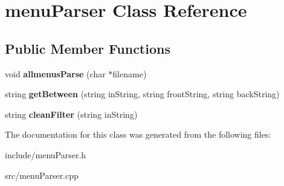 \hypertarget{classmenu_parser}{\section{menu\-Parser Class Reference}
\label{classmenu_parser}
}
\subsection*{Public Member Functions}
\begin{DoxyCompactItemize}
\item 
\hypertarget{classmenu_parser_a45594a2c3a48ac0acb2edad3d0259aef}{void {\bfseries allmenus\-Parse} (char $\ast$filename)}\label{classmenu_parser_a45594a2c3a48ac0acb2edad3d0259aef}

\item 
\hypertarget{classmenu_parser_a8061fb1d8a409aff7f2a2f59eccc7381}{string {\bfseries get\-Between} (string in\-String, string front\-String, string back\-String)}\label{classmenu_parser_a8061fb1d8a409aff7f2a2f59eccc7381}

\item 
\hypertarget{classmenu_parser_aca1249a8d37564e493c4ab6f8cd14344}{string {\bfseries clean\-Filter} (string in\-String)}\label{classmenu_parser_aca1249a8d37564e493c4ab6f8cd14344}

\end{DoxyCompactItemize}


The documentation for this class was generated from the following files\-:\begin{DoxyCompactItemize}
\item 
include/menu\-Parser.\-h\item 
src/menu\-Parser.\-cpp\end{DoxyCompactItemize}
